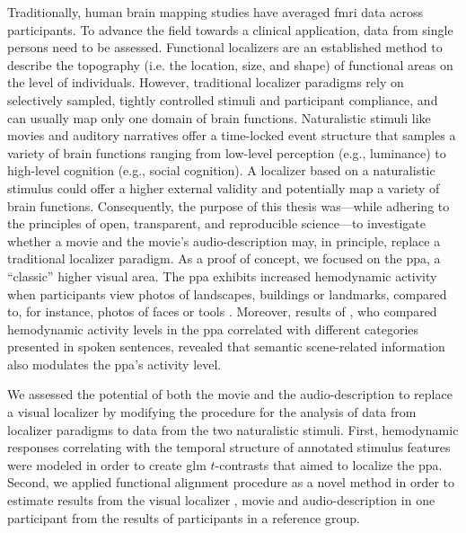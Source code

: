 %
Traditionally, human brain mapping studies have averaged \ac{fmri} data across
participants.
%
To advance the field towards a clinical application, data from single persons
need to be assessed.
Functional localizers are an established method to describe the topography (i.e.
the location, size, and shape) of functional areas on the level of individuals.
However, traditional localizer paradigms rely on selectively sampled, tightly
controlled stimuli and participant compliance, and can usually map only one
domain of brain functions.
Naturalistic stimuli like movies and auditory narratives offer a time-locked
event structure that samples a variety of brain functions ranging from low-level
perception (e.g., luminance) to high-level cognition (e.g., social cognition).
%
A localizer based on a naturalistic stimulus could offer a higher external
validity and potentially map a variety of brain functions.
Consequently, the purpose of this thesis was---while adhering to the principles
of open, transparent, and reproducible science---to investigate whether a movie
and the movie's audio-description may, in principle, replace a traditional
localizer paradigm.
As a proof of concept, we focused on the \ac{ppa}, a ``classic'' higher visual
area.
%
The \ac{ppa} exhibits increased hemodynamic activity when participants view
photos of landscapes, buildings or landmarks, compared to, for instance, photos
of faces or tools \citep[cf,][for reviews]{epstein2014neural, aminoff2013role}.
%
Moreover, results of \citet{aziz2008modulation}, who compared hemodynamic
activity levels in the \ac{ppa} correlated with different categories presented
in spoken sentences, revealed that semantic scene-related information also
modulates the \ac{ppa}'s activity level.


%
We assessed the potential of both the movie and the audio-description to replace
a visual localizer by modifying the procedure for the analysis of data from
localizer paradigms to data from the two naturalistic stimuli.
%
First, hemodynamic responses correlating with the temporal structure of
annotated stimulus features \citep[cf.][]{haeusler2016cutanno,
haeusler2021speechanno} were modeled in order to create \ac{glm} $t$-contrasts
that aimed to localize the \ac{ppa}.
Second, we applied functional alignment procedure as a novel method in order to
estimate results from the visual localizer \citep[cf.][]{sengupta2016extension},
movie and audio-description \citep[cf.][]{haeusler2022processing} in one
participant from the results of participants in a reference group.




